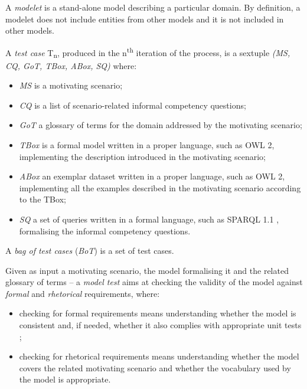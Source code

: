 \documentclass[runningheads,a4paper]{llncs}
\begin{document}
A {\em modelet} is a stand-alone model describing a particular domain. By definition, a modelet does not include entities from other models and it is not included in other models.

A {\em test case} T\textsubscript{n}, produced in the n\textsuperscript{th} iteration of the process, is a sextuple {\em (MS, CQ, GoT, TBox, ABox, SQ)} where:
\begin{itemize}
\item {\em MS} is a motivating scenario;
\item {\em CQ} is a list of scenario-related informal competency questions;
\item {\em GoT} a glossary of terms for the domain addressed by the motivating scenario;
\item {\em TBox} is a formal model written in a proper language, such as OWL 2, implementing the description introduced in the motivating scenario;
\item {\em ABox} an exemplar dataset written in a proper language, such as OWL 2, implementing all the examples described in the motivating scenario according to the TBox;
\item {\em SQ} a set of queries written in a formal language, such as SPARQL 1.1  \cite{__RefNumPara__2508_1461357291}, formalising the informal competency questions.
\end{itemize}

A {\em bag of test cases} ({\em BoT}) is a set of test cases.

Given as input a motivating scenario, the model formalising it and the related glossary of terms -- a {\em model test} aims at checking the validity of the model against {\em formal} and {\em rhetorical} requirements, where:
\begin{itemize}
\item checking for formal requirements means understanding whether the model is consistent and, if needed, whether it also complies with appropriate unit tests  \cite{__RefNumPara__2550_1461357291};
\item checking for rhetorical requirements means understanding whether the model covers the related motivating scenario and whether the vocabulary used by the model is appropriate.
\end{itemize}
\end{document}
